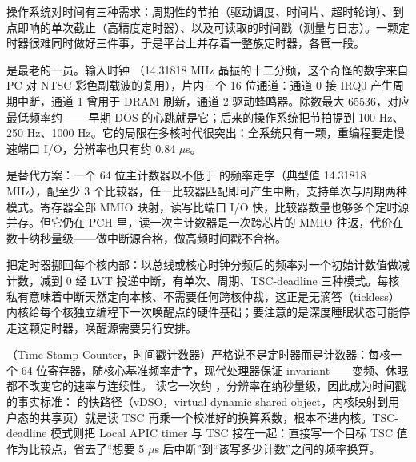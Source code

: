 
操作系统对时间有三种需求：周期性的节拍（驱动调度、时间片、超时轮询）、到点即响的单次截止（高精度定时器）、以及可读取的时间戳（测量与日志）。一颗定时器很难同时做好三件事，于是平台上并存着一整族定时器，各管一段。

 是最老的一员。输入时钟 （14.31818 MHz 晶振的十二分频，这个奇怪的数字来自 PC 对 NTSC 彩色副载波的复用），片内三个 16 位通道：通道 0 接 IRQ0 产生周期中断，通道 1 曾用于 DRAM 刷新，通道 2 驱动蜂鸣器。除数最大 65536，对应最低频率约 ——早期 DOS 的心跳就是它；后来的操作系统把节拍提到 100 Hz、250 Hz、1000 Hz。它的局限在多核时代很突出：全系统只有一颗，重编程要走慢速端口 I/O，分辨率也只有约 0.84 $\mu$s。

 是替代方案：一个 64 位主计数器以不低于  的频率走字（典型值 14.31818 MHz），配至少 3 个比较器，任一比较器匹配即可产生中断，支持单次与周期两种模式。寄存器全部 MMIO 映射，读写比端口 I/O 快，比较器数量也够多个定时源并存。但它仍在 PCH 里，读一次主计数器是一次跨芯片的 MMIO 往返，代价在数十纳秒量级——做中断源合格，做高频时间戳不合格。

 把定时器挪回每个核内部：以总线或核心时钟分频后的频率对一个初始计数值做减计数，减到 0 经 LVT 投递中断，有单次、周期、TSC-deadline 三种模式。每核私有意味着中断天然定向本核、不需要任何跨核仲裁，这正是无滴答（tickless）内核给每个核独立编程下一次唤醒点的硬件基础；要注意的是深度睡眠状态可能停走这颗定时器，唤醒源需要另行安排。

（Time Stamp Counter，时间戳计数器）严格说不是定时器而是计数器：每核一个 64 位寄存器，随核心基准频率走字，现代处理器保证 invariant——变频、休眠都不改变它的速率与连续性。 读它一次约 ，分辨率在纳秒量级，因此成为时间戳的事实标准： 的快路径（vDSO，virtual dynamic shared object，内核映射到用户态的共享页）就是读 TSC 再乘一个校准好的换算系数，根本不进内核。TSC-deadline 模式则把 Local APIC timer 与 TSC 接在一起：直接写一个目标 TSC 值作为比较点，省去了“想要 5 $\mu$s 后中断”到“该写多少计数”之间的频率换算。

